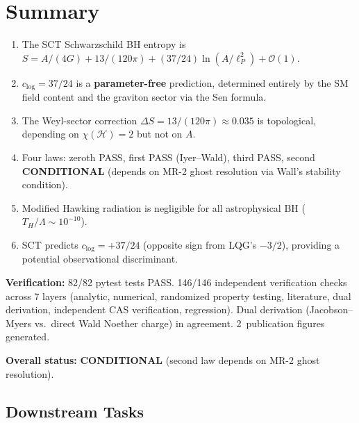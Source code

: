 \documentclass[11pt,a4paper]{article}
\theoremstyle{plain}
\theoremstyle{definition}
\begin{document}
\section{Summary}\label{sec:summary}

\begin{tcolorbox}[colback=blue!5!white, colframe=blue!50!black,
  title={\textbf{MT-1 Main Results}}]
\begin{enumerate}[nosep]
  \item The SCT Schwarzschild BH entropy is
    $S = A/(4G) + 13/(120\pi) + (37/24)\ln(A/\ell_P^2) + \mathcal{O}(1)$.
  \item $c_{\log} = 37/24$ is a \textbf{parameter-free} prediction,
    determined entirely by the SM field content and the graviton
    sector via the Sen formula.
  \item The Weyl-sector correction $\Delta S = 13/(120\pi) \approx 0.035$
    is topological, depending on $\chi(\mathcal{H}) = 2$ but not on $A$.
  \item Four laws: zeroth PASS, first PASS (Iyer--Wald),
    third PASS, second \textbf{CONDITIONAL} (depends on MR-2
    ghost resolution via Wall's stability condition).
  \item Modified Hawking radiation is negligible for all
    astrophysical BH ($T_H/\Lambda \sim 10^{-10}$).
  \item SCT predicts $c_{\log} = +37/24$ (opposite sign from
    LQG's $-3/2$), providing a potential observational discriminant.
\end{enumerate}

\medskip
\noindent\textbf{Verification:} 82/82 pytest tests PASS.
146/146 independent verification checks across 7 layers
(analytic, numerical, randomized property testing, literature, dual derivation,
independent CAS verification, regression).
Dual derivation (Jacobson--Myers vs.\ direct Wald Noether charge)
in agreement.
2~publication figures generated.

\medskip
\noindent\textbf{Overall status:}
\textcolor{orange!70!black}{\textbf{CONDITIONAL}}
(second law depends on MR-2 ghost resolution).
\end{tcolorbox}

\subsection{Downstream Tasks}
\end{document}
